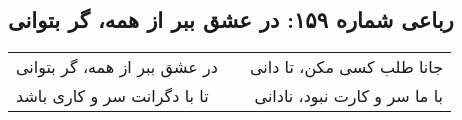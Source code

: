 \begin{center}
\section*{رباعی شماره ۱۵۹: در عشق ببر از همه، گر بتوانی}
\label{sec:159}
\begin{longtable}{l p{0.5cm} r}
در عشق ببر از همه، گر بتوانی
&&
جانا طلب کسی مکن، تا دانی
\\
تا با دگرانت سر و کاری باشد
&&
با ما سر و کارت نبود، نادانی
\\
\end{longtable}
\end{center}
